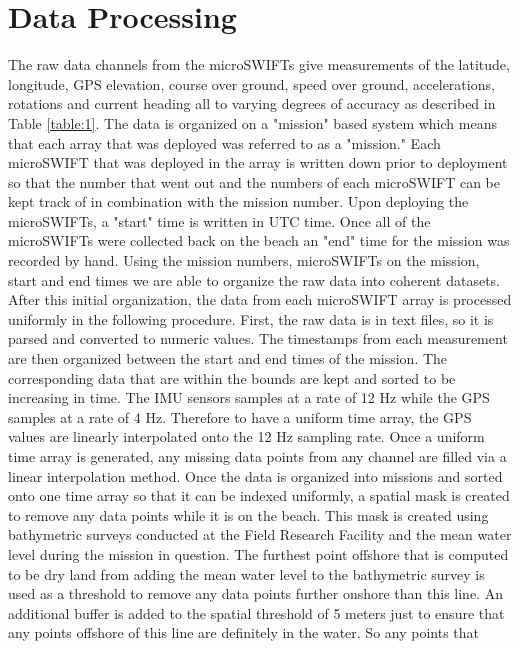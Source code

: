 \documentclass[essd, manuscript]{copernicus}
\begin{document}
\section{Data Processing}
 The raw data channels from the microSWIFTs give measurements of the latitude, longitude, GPS elevation, course over ground, speed over ground, accelerations, rotations and current heading all to varying degrees of accuracy as described in Table \ref{table:1}.
 The data is organized on a "mission" based system which means that each array that was deployed was referred to as a "mission." Each microSWIFT that was deployed in the array is written down prior to deployment so that the number that went out and the numbers of each microSWIFT can be kept track of in combination with the mission number. Upon deploying the microSWIFTs, a "start" time is written in UTC time. Once all of the microSWIFTs were collected back on the beach an "end" time for the mission was recorded by hand. Using the mission numbers, microSWIFTs on the mission, start and end times we are able to organize the raw data into coherent datasets. After this initial organization, the data from each microSWIFT array is processed uniformly in the following procedure. First, the raw data is in text files, so it is parsed and converted to numeric values. The timestamps from each measurement are then organized between the start and end times of the mission. The corresponding data that are within the bounds are kept and sorted to be increasing in time. The IMU sensors samples at a rate of 12 Hz while the GPS samples at a rate of 4 Hz. Therefore to have a uniform time array, the GPS values are linearly interpolated onto the 12 Hz sampling rate. Once a uniform time array is generated, any missing data points from any channel are filled via a linear interpolation method. Once the data is organized into missions and sorted onto one time array so that it can be indexed uniformly, a spatial mask is created to remove any data points while it is on the beach. This mask is created using bathymetric surveys conducted at the Field Research Facility and the mean water level during the mission in question. The furthest point offshore that is computed to be dry land from adding the mean water level to the bathymetric survey is used as a threshold to remove any data points further onshore than this line. An additional buffer is added to the spatial threshold of 5 meters just to ensure that any points offshore of this line are definitely in the water. So any points that 
\end{document}
